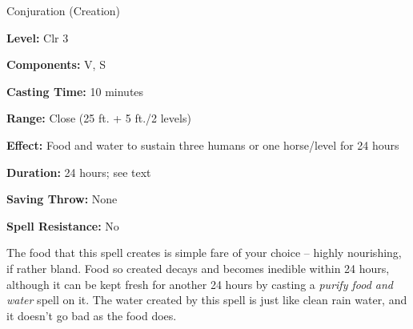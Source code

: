 
Conjuration (Creation)

\textbf{Level:} Clr 3

\textbf{Components:} V, S

\textbf{Casting Time:} 10 minutes

\textbf{Range:} Close (25 ft. + 5 ft./2 levels)

\textbf{Effect:} Food and water to sustain three humans or one horse/level for 
24 hours

\textbf{Duration:} 24 hours; see text

\textbf{Saving Throw:} None

\textbf{Spell Resistance:} No

The food that this spell creates is simple fare of your choice -- highly nourishing, 
if rather bland. Food so created decays and becomes inedible within 24 hours, although 
it can be kept fresh for another 24 hours by casting a \textit{purify food and 
water} spell on it. The water created by this spell is just like clean rain water, 
and it doesn't go bad as the food does.

